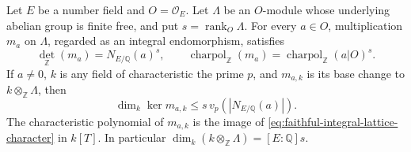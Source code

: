 \begin{srlemma}
\label{lem:faithful-integral-lattice-norm}
Let \(E\) be a number field and \(O=\mathcal O_E\).
Let \(\Lambda\) be an \(O\)-module whose underlying abelian group
is finite free, and put \(s=\operatorname{rank}_O\Lambda\).
For every \(a\in O\), multiplication \(m_a\) on \(\Lambda\),
regarded as an integral endomorphism, satisfies
\[
 \det_{\mathbb Z}(m_a)=N_{E/\mathbb Q}(a)^s,\qquad
 \operatorname{charpol}_{\mathbb Z}(m_a)
                   =\operatorname{charpol}_{\mathbb Z}(a|O)^s .
 \tag{NN1}\label{eq:faithful-integral-lattice-character}
\]
If \(a\ne0\), \(k\) is any field of characteristic the prime \(p\),
and \(m_{a,k}\) is its base change to \(k\otimes_{\mathbb Z}\Lambda\),
then
\[
 \dim_k\ker m_{a,k}\le s\,v_p(|N_{E/\mathbb Q}(a)|).
 \tag{NN2}\label{eq:faithful-integral-lattice-kernel}
\]
The characteristic polynomial of \(m_{a,k}\) is the image of
\eqref{eq:faithful-integral-lattice-character} in \(k[T]\).
In particular \(\dim_k(k\otimes_{\mathbb Z}\Lambda)=[E:\mathbb Q]s\).
\end{srlemma}
